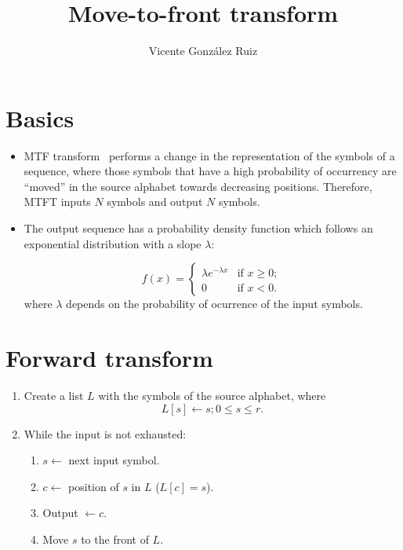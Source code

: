 \title{Move-to-front transform}
\author{Vicente González Ruiz}
\maketitle
\tableofcontents

\section{Basics}
\begin{itemize}
\item
  MTF transform~\cite{manzini2001analysis} performs a change in the
  representation of the symbols of a sequence, where those symbols
  that have a high probability of occurrency are ``moved'' in the
  source alphabet towards decreasing positions.  Therefore, MTFT
  inputs \(N\) symbols and output \(N\) symbols.
\item
  The output sequence has a probability density function which follows
  an exponential distribution with a slope \(\lambda\):

  \begin{equation}
    f(x) = \left\{
      \begin{array}{ll}
        \lambda e^{-\lambda x} & \mbox{if $x \geq 0$};\\
        0 & \mbox{if $x < 0$}.
      \end{array} \right.
  \end{equation}
  where \(\lambda\) depends on the probability of ocurrence of the input
  symbols.
\end{itemize}

\section{Forward transform}
\begin{enumerate}
\def\labelenumi{\arabic{enumi}.}
\tightlist
\item
  Create a list \(L\) with the symbols of the source alphabet, where
  \[L[s]\leftarrow s; 0\le s\le r.\]
\item
  While the input is not exhausted:
  \begin{enumerate}
  \def\labelenumii{\arabic{enumii}.}
  \tightlist
  \item
    \(s\leftarrow\) next input symbol.
  \item
    \(c\leftarrow\) position of \(s\) in \(L\) (\(L[c]=s\)).
  \item
    Output \(\leftarrow c\).
  \item
    Move \(s\) to the front of \(L\).
  \end{enumerate}
\end{enumerate}

